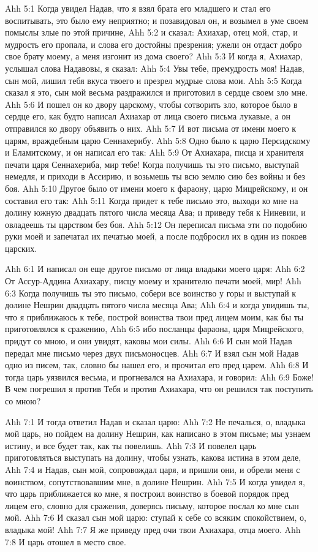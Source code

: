 \vs Ahh 5:1
Когда увидел Надав, что я взял брата его младшего и стал его воспитывать, это было ему неприятно; и позавидовал он, и возымел в уме своем помыслы злые по этой причине,
\vs Ahh 5:2
и сказал: Ахиахар, отец мой, стар, и мудрость его пропала, и слова его достойны презрения; ужели он отдаст добро свое брату моему, а меня изгонит из дома своего?
\vs Ahh 5:3
И когда я, Ахиахар, услышал слова Надавовы, я сказал:
\vs Ahh 5:4
Увы тебе, премудрость моя! Надав, сын мой, лишил тебя вкуса твоего и презрел мудрые слова мои.
\vs Ahh 5:5
Когда сказал я это, сын мой весьма раздражился и приготовил в сердце своем зло мне.
\vs Ahh 5:6
И пошел он ко двору царскому, чтобы сотворить зло, которое было в сердце его, как будто написал Ахиахар от лица своего письма лукавые, а он отправился ко двору объявить о них.
\vs Ahh 5:7
И вот письма от имени моего к царям, враждебным царю Сеннахерибу.
\vs Ahh 5:8
Одно было к царю Персидскому и Еламитскому, и он написал его так:
\vs Ahh 5:9
От Ахиахара, писца и хранителя печати царя Сеннахериба, мир тебе! Когда получишь ты это письмо, выступай немедля, и приходи в Ассирию, и возьмешь ты всю землю сию без войны и без боя.
\vs Ahh 5:10
Другое было от имени моего к фараону, царю Мицрейскому, и он составил его так:
\vs Ahh 5:11
Когда придет к тебе письмо это, выходи ко мне на долину южную двадцать пятого числа месяца Ава; и приведу тебя к Ниневии, и овладеешь ты царством без боя.
\vs Ahh 5:12
Он переписал письма эти по подобию руки моей и запечатал их печатью моей, а после подбросил их в один из покоев царских.

\vs Ahh 6:1
И написал он еще другое письмо от лица владыки моего царя:
\vs Ahh 6:2
От Ассур-Аддина Ахиахару, писцу моему и хранителю печати моей, мир!
\vs Ahh 6:3
Когда получишь ты это письмо, собери все воинство у горы и выступай к долине Нешрин двадцать пятого числа месяца Ава;
\vs Ahh 6:4
и когда увидишь ты, что я приближаюсь к тебе, построй воинства твои пред лицем моим, как бы ты приготовлялся к сражению,
\vs Ahh 6:5
ибо посланцы фараона, царя Мицрейского, придут со мною, и они увидят, каковы мои силы.
\vs Ahh 6:6
И сын мой Надав передал мне письмо через двух письмоносцев.
\vs Ahh 6:7
И взял сын мой Надав одно из писем, так, словно бы нашел его, и прочитал его пред царем.
\vs Ahh 6:8
И тогда царь уязвился весьма, и прогневался на Ахиахара, и говорил:
\vs Ahh 6:9
Боже! В чем погрешил я против Тебя и против Ахиахара, что он решился так поступить со мною?

\vs Ahh 7:1
И тогда ответил Надав и сказал царю:
\vs Ahh 7:2
Не печалься, о, владыка мой царь, но пойдем на долину Нешрин, как написано в этом письме; мы узнаем истину, и все будет так, как ты повелишь.
\vs Ahh 7:3
И повелел царь приготовляться выступать на долину, чтобы узнать, какова истина в этом деле,
\vs Ahh 7:4
и Надав, сын мой, сопровождал царя, и пришли они, и обрели меня с воинством, сопутствовавшим мне, в долине Нешрин.
\vs Ahh 7:5
И когда увидел я, что царь приближается ко мне, я построил воинство в боевой порядок пред лицем его, словно для сражения, доверясь письму, которое послал ко мне сын мой.
\vs Ahh 7:6
И сказал сын мой царю: ступай к себе со всяким спокойствием, о, владыка мой!
\vs Ahh 7:7
Я же приведу пред очи твои Ахиахара, отца моего.
\vs Ahh 7:8
И царь отошел в место свое.

